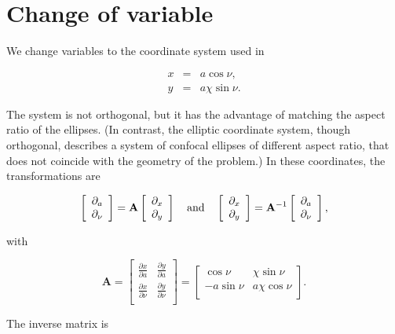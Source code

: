 \documentclass[apj]{emulateapj}
\newcommand{\pderiv}[2]{\frac{\partial #1}{\partial #2}}
\newcommand{\vt}[1]{\mathbf{#1}}       %
\newcommand{\beq}{\begin{equation}}
\newcommand{\eeq}{\end{equation}}
\newcommand{\beqn}{\begin{eqnarray}}
\newcommand{\eeqn}{\end{eqnarray}}
\begin{document}
\section{Change of variable}
\label{sect:coordinate-transformation}

We change variables to the coordinate system used in \citet{Chang-Oishi10}

\beqn
  x &=& a \cos\nu, \label{eq:change-x}\\
  y &=& a\chi\sin\nu.  \label{eq:change-y}
\eeqn

The system is not orthogonal, but it has the advantage of matching the
aspect ratio of the ellipses. (In contrast, the elliptic coordinate
system, though orthogonal, describes a system of confocal ellipses of
different aspect ratio, that does not coincide with the geometry of
the problem.) In these coordinates, the transformations are 

\beq
\left[\begin{array}{c}
    \partial_{a}  \\
    \partial_{\nu}
  \end{array}\right] = \vt{A} 
  \left[\begin{array}{c}
      \partial_{x}  \\
      \partial_{y}
    \end{array}\right] 
%
\quad {\rm and} \quad 
%
\left[\begin{array}{c}
    \partial_{x}  \\
    \partial_{y}
  \end{array}\right] = \vt{A}^{-1} 
  \left[\begin{array}{c}
      \partial_{a}  \\
      \partial_{\nu}
    \end{array}\right],  
%
\eeq

\noindent with 

\beq
\vt{A} = \left[\begin{array}{cc}
\pderiv{x}{a}  & \pderiv{y}{a}  \\
\pderiv{x}{\nu}  & \pderiv{y}{\nu} \\
\end{array}\right] = \left[\begin{array}{cc}
\cos\nu  & \chi\sin\nu  \\
-a\sin\nu  & a\chi\cos\nu \\
\end{array}\right]. 
\eeq

\noindent The inverse matrix is 
\end{document}
